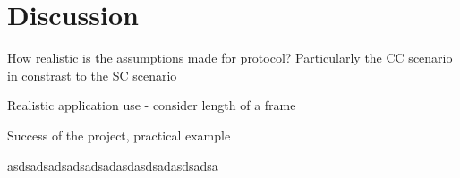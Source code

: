 \chapter{Discussion}
How realistic is the assumptions made for protocol? Particularly the CC scenario in constrast to the SC scenario

Realistic application use - consider length of a frame

Success of the project, practical example


asdsadsadsadsadsadasdasdsadasdsadsa